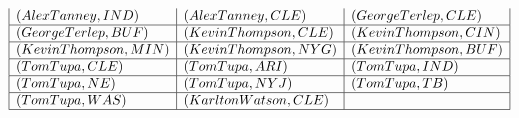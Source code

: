 \documentclass{ximera}
\begin{document}
\begin{center}
\[\begin{array}{|l|l|l|}
(Alex Tanney, IND) & (Alex Tanney, CLE) & (George Terlep, CLE) \\\hline 


(George Terlep, BUF) & (Kevin Thompson, CLE) & (Kevin Thompson, CIN) \\\hline 


(Kevin Thompson, MIN) & (Kevin Thompson, NYG) & (Kevin Thompson, BUF) \\\hline 


(Tom Tupa, CLE) & (Tom Tupa, ARI) & (Tom Tupa, IND) \\\hline


(Tom Tupa, NE) & (Tom Tupa, NYJ) & (Tom Tupa, TB) \\\hline


(Tom Tupa, WAS) & (Karlton Watson, CLE) &    \\\hline

\end{array}
\]
\end{center}
\end{document}
